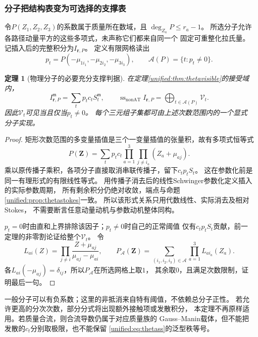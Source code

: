\documentclass[11pt,a4paper,oneside]{ctexart}
\theoremstyle{cnplain}
\newtheorem{theorem}{定理}[section]
\theoremstyle{definition}
\theoremstyle{remark}
\numberwithin{equation}{section}
\begin{document}
\subsubsection{分子把结构表变为可选择的支撑表}
令$P(Z_1,Z_2,Z_3)$的系数属于质量所在数域，且
$\deg_{Z_a}P\le r_a-1$。
所选分子允许各路径动量平方的这些多项式，未声称它们都来自同一个
固定可重整化拉氏量。记插入后的完整积分为$I_{\mathbf r,P}$。
定义有限网格读出
\[
 p_t=P(-\mu_{1i_1},-\mu_{2i_2},-\mu_{3i_3}),\qquad
 \mathcal A(P)=\{t:p_t\ne0\}.
\]

\begin{theorem}[物理分子的必要充分支撑判据]\label{unified:thm:thetanumerator}
在定理\ref{unified:thm:thetavisible}的接受域内，
\begin{equation}\label{unified:eq:thetapinsert}
 I_{\mathbf r,P}^{\mathfrak m}=\sum_t p_tc_tS_t^{\mathfrak m},
 \qquad
 \operatorname{ss}_{\mathrm{nonAT}} I_{\mathbf r,P}
       =\bigoplus_{t\in\mathcal A(P)}\mathcal V_t .
\end{equation}
因此$\mathcal V_t$可见当且仅当$p_t\ne0$。
每个三元组子集都可由上述次数范围内的一个显式分子实现。
\end{theorem}
\begin{proof}
矩形次数范围的多变量插值是三个一变量插值的张量积，故有多项式恒等式
\[
 P(\mathbf Z)=\sum_t p_tc_t
       \prod_{a=1}^3\prod_{j\ne i_a}(Z_a+\mu_{aj}).
\]
乘以原传播子乘积，各项分子直接取消串联传播子，留下$c_tp_tS_t$。
这在参数化前是同一有理形式的有限线性等式。
用传播子消去后的线性Schwinger参数化定义插入的实际参数周期，
所有剩余积分仍绝对收敛，端点与命题\ref{unified:prop:thetastokes}一致。
所以该形式关系只用代数线性、实际消去及相对Stokes，
不需要断言任意动量动机与参数动机整体同构。

$p_t=0$时由直和上界排除该因子；$p_t\ne0$时自己的正常阈值
仅有$c_tp_tS_t$贡献，前一定理的非零割论证给整个$\mathcal V_t$。
令
\[
 L_{ai}(Z)=
 \prod_{j\ne i}\frac{Z+\mu_{aj}}{\mu_{aj}-\mu_{ai}} ,
 \qquad
 P_{\mathcal A}(\mathbf Z)=
       \sum_{(i_1,i_2,i_3)\in\mathcal A}\prod_{a=1}^3L_{ai_a}(Z_a).
\]
各$L_{ai}(-\mu_{aj})=\delta_{ij}$，所以$P_{\mathcal A}$在所选网格上取$1$，
其余取$0$，且满足次数限制，证明最后一句。
\end{proof}

一般分子可以有负系数；这里的非抵消来自特有阈值，不依赖总分子正性。
若允许更高的分次次数，部分分式将出现额外接触项或发散积分，
本定理不再原样适用。若质量合流，则合流导数仍属于对应质量族的
Gauss--Manin载体，但不能把发散的$c_t$分别取极限，也不能保留
\eqref{unified:eq:thetass}的泛型秩等号。
\end{document}
